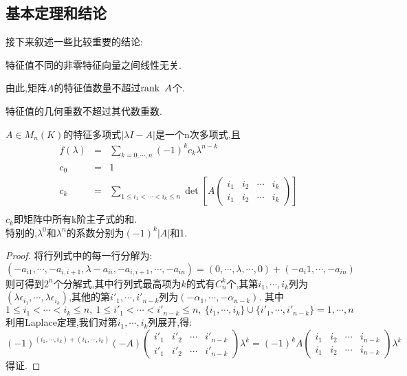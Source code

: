 \documentclass[UTF8,a4paper,notitlepage]{book}
\begin{document}
        \subsection{基本定理和结论}
        接下来叙述一些比较重要的结论:
        \begin{theorem}
            特征值不同的非零特征向量之间线性无关.
        \end{theorem}
        由此,矩阵$A$的特征值数量不超过$\operatorname{rank}~A$个.
        \begin{theorem}
            特征值的几何重数不超过其代数重数.
        \end{theorem}
        \begin{theorem}
            $A\in M_n(K)$的特征多项式$|\lambda I-A|$是一个n次多项式,且
            \begin{eqnarray*}
                f(\lambda)&=&\sum_{k=0,\cdots,n} (-1)^k c_k\lambda^{n-k}\\ 
                c_0&=&1\\ 
                c_k&=&\sum_{1\leq i_1<\cdots<i_k\leq n} \det\left[A\begin{pmatrix}i_1 & i_2 & \cdots & i_k \\ i_1 & i_2 & \cdots & i_k\end{pmatrix}\right] \\ 
            \end{eqnarray*}
            $c_k$即矩阵中所有k阶主子式的和.\\ 
            特别的,$\lambda^{0}$和$\lambda^{n}$的系数分别为$(-1)^k|A|$和1.
        \end{theorem}
        \begin{proof}
            将行列式中的每一行分解为:$$(-a_{i1},\cdots,-a_{i,i+1},\lambda-a_{ii},-a_{i,i+1},\cdots,-a_{in})=(0,\cdots,\lambda,\cdots,0)+(-a_i1,\cdots,-a_{in})$$
            则可得到$2^n$个分解式,其中行列式最高项为$k$的式有$C^k_n$个,其第$i_1,\cdots,i_k$列为$(\lambda\epsilon_{i_1},\cdots,\lambda\epsilon_{i_k})$,其他的第$i'_1,\cdots,i'_{n-k}$列为$(-\alpha_1,\cdots,-\alpha_{n-k})$.
            其中$1\leq i_1<\cdots<i_k\leq n,~1\leq i'_1<\cdots<i'_{n-k}\leq n,~\{i_1,\cdots,i_k\}\cup\{i'_1,\cdots,i'_{n-k}\}={1,\cdots,n}$\\ 
            利用Laplace定理,我们对第$i_1,\cdots,i_k$列展开,得:
            $$(-1)^{(i_1,\cdots,i_k)+(i_1,\cdots,i_k)}(-A)\begin{pmatrix}i'_1 & i'_2 & \cdots & i'_{n-k} \\ i'_1 & i'_2 & \cdots & i'_{n-k}\end{pmatrix}\lambda^k=(-1)^kA\begin{pmatrix}i_1 & i_2 & \cdots & i_{n-k} \\ i_1 & i_2 & \cdots & i_{n-k}\end{pmatrix}\lambda^k$$
            得证.
        \end{proof}
\end{document}
